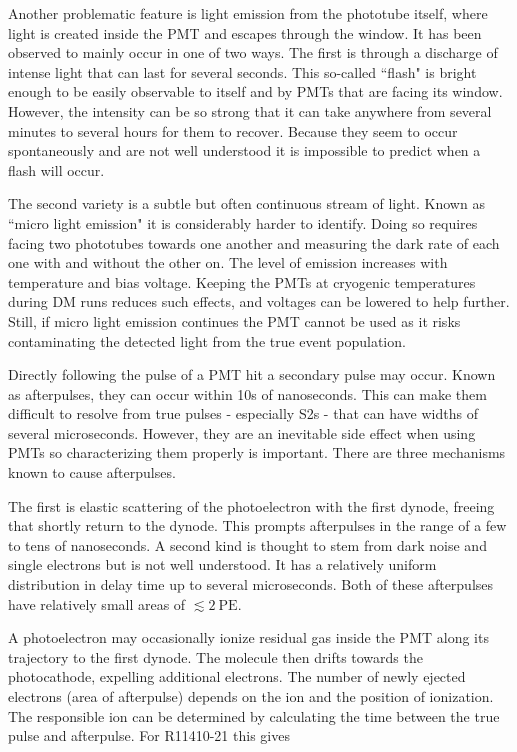 Another problematic feature is light emission from the phototube itself, where light is created inside the PMT and escapes through the
window.  It has been observed to mainly occur in one of two ways.  The first is through a discharge of intense light that can last for
several seconds.  This so-called ``flash" is bright enough to be easily observable to itself and by PMTs that are facing its
window.  However, the intensity can be so strong that it can take anywhere from several minutes to several hours for them to
recover.  Because they seem to occur spontaneously and are not well understood it is impossible to predict when a flash will occur.

The second variety is a subtle but often continuous stream of light.  Known as ``micro light emission" it is considerably harder to
identify.  Doing so requires facing two phototubes towards one another and measuring the dark rate of each one with and without the other
on.  The level of emission increases with temperature and bias voltage.  Keeping the PMTs at cryogenic temperatures during DM runs reduces
such effects, and voltages can be lowered to help further.  Still, if micro light emission continues the PMT cannot be used as it risks
contaminating the detected light from the true event population.

Directly following the pulse of a PMT hit a secondary pulse may occur.  Known as afterpulses, they can occur within 10s of
nanoseconds.  This can make them difficult to resolve from true pulses - especially S2s - that can have widths of several
microseconds.  However, they are an inevitable side effect when using PMTs so characterizing them properly is important.  There are three
mechanisms known to cause afterpulses.

The first is elastic scattering of the photoelectron with the first dynode, freeing \electron that shortly return to the dynode.  This
prompts afterpulses in the range of a few to tens of nanoseconds.  A second kind is thought to stem
from dark noise and single electrons but is not well understood.  It has a relatively uniform distribution in delay time up to several
microseconds.  Both of these afterpulses have relatively small areas of $\lesssim 2\ \mathrm{PE}$.

A photoelectron may occasionally ionize residual gas inside the PMT along its trajectory to the first dynode.  The molecule then drifts
towards the photocathode, expelling additional electrons.  The number of newly ejected electrons (area of afterpulse) depends
on the ion and the position of ionization.  The responsible ion can be determined by calculating the time between the true pulse and
afterpulse.  For R11410-21 this gives

